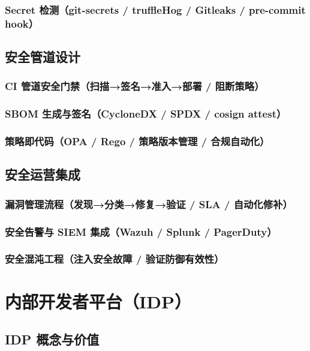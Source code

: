 \documentclass[12pt,UTF8]{ctexbook}
\begin{document}
    \subsection{Secret 检测（git-secrets / truffleHog / Gitleaks / pre-commit hook）}

  \section{安全管道设计}
    \subsection{CI 管道安全门禁（扫描→签名→准入→部署 / 阻断策略）}
    \subsection{SBOM 生成与签名（CycloneDX / SPDX / cosign attest）}
    \subsection{策略即代码（OPA / Rego / 策略版本管理 / 合规自动化）}

  \section{安全运营集成}
    \subsection{漏洞管理流程（发现→分类→修复→验证 / SLA / 自动化修补）}
    \subsection{安全告警与 SIEM 集成（Wazuh / Splunk / PagerDuty）}
    \subsection{安全混沌工程（注入安全故障 / 验证防御有效性）}


\chapter{内部开发者平台（IDP）}
\label{chap:idp}

  \section{IDP 概念与价值}
\end{document}
